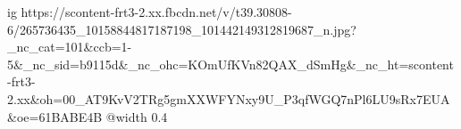  
 
 
 
 

\ifcmt
  ig https://scontent-frt3-2.xx.fbcdn.net/v/t39.30808-6/265736435_10158844817187198_101442149312819687_n.jpg?_nc_cat=101&ccb=1-5&_nc_sid=b9115d&_nc_ohc=KOmUfKVn82QAX_dSmHg&_nc_ht=scontent-frt3-2.xx&oh=00_AT9KvV2TRg5gmXXWFYNxy9U_P3qfWGQ7nPl6LU9sRx7EUA&oe=61BABE4B
  @width 0.4
\fi
